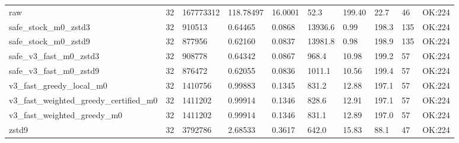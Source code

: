 \begin{table}[t]
\begin{tabular}{llllllllll}
raw & 32 & 167773312 & 118.78497 & 16.0001 & 52.3 & 199.40 & 22.7 & 46 & OK:224 \\
safe\_stock\_m0\_zstd3 & 32 & 910513 & 0.64465 & 0.0868 & 13936.6 & 0.99 & 198.3 & 135 & OK:224 \\
safe\_stock\_m0\_zstd9 & 32 & 877956 & 0.62160 & 0.0837 & 13981.8 & 0.98 & 198.9 & 135 & OK:224 \\
safe\_v3\_fast\_m0\_zstd3 & 32 & 908778 & 0.64342 & 0.0867 & 968.4 & 10.98 & 199.2 & 57 & OK:224 \\
safe\_v3\_fast\_m0\_zstd9 & 32 & 876472 & 0.62055 & 0.0836 & 1011.1 & 10.56 & 199.4 & 57 & OK:224 \\
v3\_fast\_greedy\_local\_m0 & 32 & 1410756 & 0.99883 & 0.1345 & 831.2 & 12.88 & 197.1 & 57 & OK:224 \\
v3\_fast\_weighted\_greedy\_certified\_m0 & 32 & 1411202 & 0.99914 & 0.1346 & 828.6 & 12.91 & 197.1 & 57 & OK:224 \\
v3\_fast\_weighted\_greedy\_m0 & 32 & 1411202 & 0.99914 & 0.1346 & 831.1 & 12.89 & 197.0 & 57 & OK:224 \\
zstd9 & 32 & 3792786 & 2.68533 & 0.3617 & 642.0 & 15.83 & 88.1 & 47 & OK:224 \\
\hline
\end{tabular}
\end{table}
